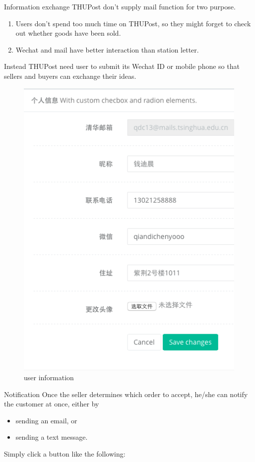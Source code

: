 \documentclass[final]{beamer}
\newlength{\onecolwid}
\begin{document}
\begin{frame}[t]
\begin{columns}[t]
\begin{column}{\onecolwid}
        \begin{block}{Information exchange}
        THUPost don't supply mail function for two purpose. 
        \begin{enumerate}
        \item Users don't spend too much time on THUPost, so they might forget to check out whether goods have been sold.
        \item Wechat and mail have better interaction than station letter.
        \end{enumerate}

        Instead THUPost need user to submit its Wechat ID or mobile phone so that sellers and buyers can exchange their ideas.


        \end{block}

        \begin{figure}
        \includegraphics[width=0.4\linewidth]{information.png}
        \caption{user information}
        \end{figure}


        \begin{block}{Notification}
            Once the seller determines which order to accept, he/she can notify the customer at once, either by
            \begin{itemize}
                \item sending an email, or
                \item sending a text message.
            \end{itemize}
            Simply click a button like the following:


\end{block}
\end{column}
\end{columns}
\end{frame}
\end{document}
